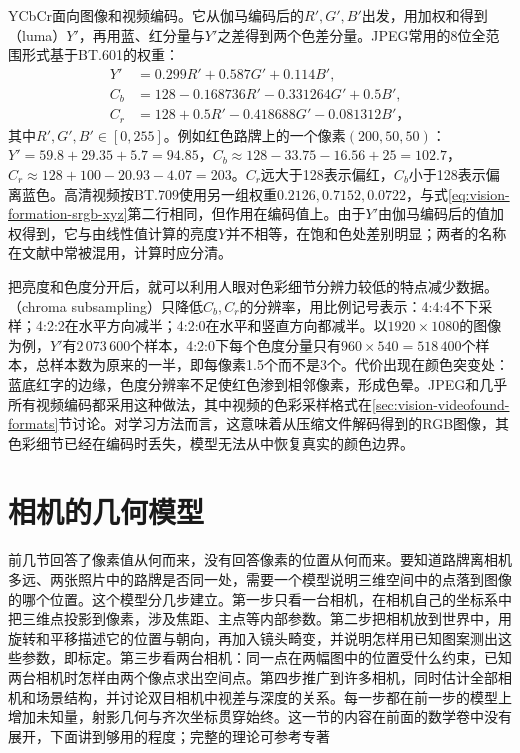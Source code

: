 YCbCr面向图像和视频编码。它从伽马编码后的$R',G',B'$出发，用加权和得到（luma）$Y'$，再用蓝、红分量与$Y'$之差得到两个色差分量。JPEG常用的8位全范围形式基于BT.601的权重：
\begin{equation}
  \begin{aligned}
    Y'&=0.299R'+0.587G'+0.114B',\\
    C_b&=128-0.168736R'-0.331264G'+0.5B',\\
    C_r&=128+0.5R'-0.418688G'-0.081312B'\text{，}
  \end{aligned}
  \label{eq:vision-formation-ycbcr}
\end{equation}
其中$R',G',B'\in[0,255]$。例如红色路牌上的一个像素$(200,50,50)$：$Y'=59.8+29.35+5.7=94.85$，$C_b\approx128-33.75-16.56+25=102.7$，$C_r\approx128+100-20.93-4.07=203$。$C_r$远大于128表示偏红，$C_b$小于128表示偏离蓝色。高清视频按BT.709使用另一组权重$0.2126,0.7152,0.0722$，与式\eqref{eq:vision-formation-srgb-xyz}第二行相同，但作用在编码值上。由于$Y'$由伽马编码后的值加权得到，它与由线性值计算的亮度$Y$并不相等，在饱和色处差别明显；两者的名称在文献中常被混用，计算时应分清。

把亮度和色度分开后，就可以利用人眼对色彩细节分辨力较低的特点减少数据。（chroma subsampling）只降低$C_b,C_r$的分辨率，用比例记号表示：4:4:4不下采样；4:2:2在水平方向减半；4:2:0在水平和竖直方向都减半。以$1920\times1080$的图像为例，$Y'$有$2\,073\,600$个样本，4:2:0下每个色度分量只有$960\times540=518\,400$个样本，总样本数为原来的一半，即每像素1.5个而不是3个。代价出现在颜色突变处：蓝底红字的边缘，色度分辨率不足使红色渗到相邻像素，形成色晕。JPEG和几乎所有视频编码都采用这种做法，其中视频的色彩采样格式在\ref{sec:vision-videofound-formats}节讨论。对学习方法而言，这意味着从压缩文件解码得到的RGB图像，其色彩细节已经在编码时丢失，模型无法从中恢复真实的颜色边界。

\section{相机的几何模型}
\label{sec:vision-formation-camera}

前几节回答了像素值从何而来，没有回答像素的位置从何而来。要知道路牌离相机多远、两张照片中的路牌是否同一处，需要一个模型说明三维空间中的点落到图像的哪个位置。这个模型分几步建立。第一步只看一台相机，在相机自己的坐标系中把三维点投影到像素，涉及焦距、主点等内部参数。第二步把相机放到世界中，用旋转和平移描述它的位置与朝向，再加入镜头畸变，并说明怎样用已知图案测出这些参数，即标定。第三步看两台相机：同一点在两幅图中的位置受什么约束，已知两台相机时怎样由两个像点求出空间点。第四步推广到许多相机，同时估计全部相机和场景结构，并讨论双目相机中视差与深度的关系。每一步都在前一步的模型上增加未知量，射影几何与齐次坐标贯穿始终。这一节的内容在前面的数学卷中没有展开，下面讲到够用的程度；完整的理论可参考专著


